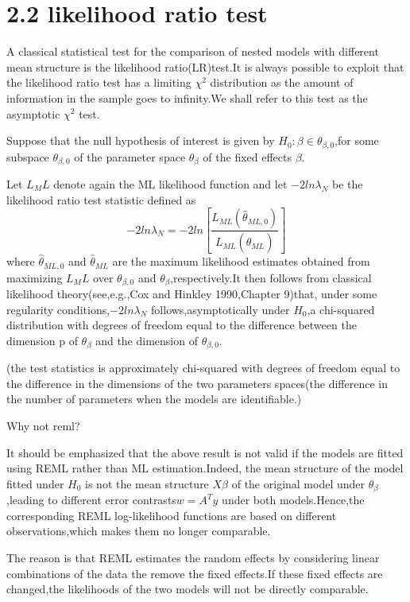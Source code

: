 \documentclass[a4paper,11pt]{article}
\begin{document}
\section{2.2 likelihood ratio test}

A classical statistical test for the comparison of nested models with different mean structure is the likelihood ratio(LR)test.It is always possible to exploit that the likelihood ratio test has a limiting $\chi^2$ distribution as the amount of information in the sample goes to infinity.We shall refer to this test as the asymptotic $\chi^2$ test.

Suppose that the null hypothesis of interest is given by $H_0 :\beta \in \theta_{\beta,0}$,for some subspace $\theta_{\beta,0}$ of the parameter space $\theta_\beta$ of the fixed effects $\beta$.

Let $L_ML$ denote again the ML likelihood function and let $-2ln\lambda_N$ be the likelihood ratio test statistic defined as
\begin{equation}\label{eq:10}
-2ln\lambda_N = -2 ln[\frac{L_{ML}(\widehat{\theta}_{ML,0})}{L_{ML}(\widehat{\theta}_{ML})}]
\end{equation}
where $\widehat{\theta}_{ML,0}$ and $\widehat{\theta}_{ML}$ are the maximum likelihood estimates obtained from maximizing $L_ML$ over $\theta_{\beta,0}$ and $\theta_\beta$,respectively.It then follows from classical likelihood theory(see,e.g.,Cox and Hinkley 1990,Chapter 9)that, under some regularity conditions,$-2ln \lambda_N$ follows,asymptotically under $H_0$,a chi-squared distribution with degrees of freedom equal to the difference between the dimension p of $\theta_\beta$ and the dimension of $\theta_{\beta,0}$.

(the test statistics is approximately chi-squared with degrees of freedom equal to the difference in the dimensions of the two parameters spaces(the difference in the number of parameters when the models are identifiable.)

Why not reml?

It should be emphasized that the above result is not valid if the models are fitted using REML rather than ML estimation.Indeed, the mean structure of the model fitted under $H_0$ is not the mean structure $X\beta$ of the original model under $\theta_\beta$,leading to different error contrasts$w = A^T y$ under both models.Hence,the corresponding REML log-likelihood functions are based on different observations,which makes them no longer comparable.

The reason is that REML estimates the random effects by considering linear combinations of the data the remove the fixed effects.If these fixed effects are changed,the likelihoods of the two models will not be directly comparable.
\end{document}
